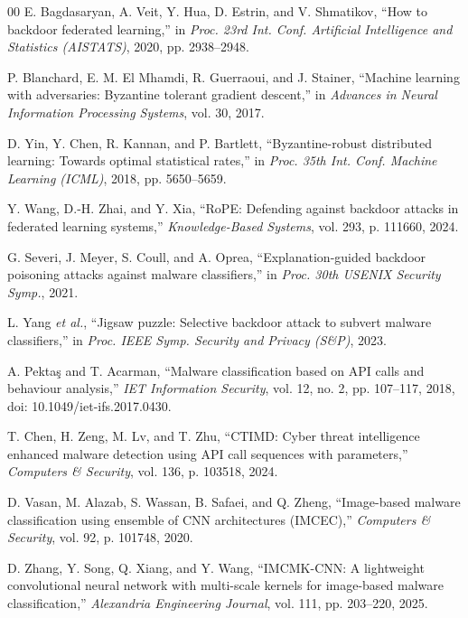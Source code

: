 \documentclass[conference]{IEEEtran}
\begin{document}
\begin{thebibliography}{00}
E. Bagdasaryan, A. Veit, Y. Hua, D. Estrin, and V. Shmatikov,
``How to backdoor federated learning,''
in \emph{Proc. 23rd Int. Conf. Artificial Intelligence and Statistics (AISTATS)},
2020, pp. 2938--2948.

P. Blanchard, E. M. El Mhamdi, R. Guerraoui, and J. Stainer, 
``Machine learning with adversaries: Byzantine tolerant gradient descent,'' 
in \emph{Advances in Neural Information Processing Systems}, vol. 30, 2017.

D. Yin, Y. Chen, R. Kannan, and P. Bartlett,
``Byzantine-robust distributed learning: Towards optimal statistical rates,''
in \emph{Proc. 35th Int. Conf. Machine Learning (ICML)},
2018, pp. 5650--5659.

Y. Wang, D.-H. Zhai, and Y. Xia,
``RoPE: Defending against backdoor attacks in federated learning systems,''
\emph{Knowledge-Based Systems}, vol. 293, p. 111660, 2024.

G. Severi, J. Meyer, S. Coull, and A. Oprea,
``Explanation-guided backdoor poisoning attacks against malware classifiers,''
in \emph{Proc. 30th USENIX Security Symp.}, 2021.

L. Yang \emph{et al.},
``Jigsaw puzzle: Selective backdoor attack to subvert malware classifiers,''
in \emph{Proc. IEEE Symp. Security and Privacy (S\&P)}, 2023.

A. Pektaş and T. Acarman, 
``Malware classification based on API calls and behaviour analysis,'' 
\emph{IET Information Security}, vol. 12, no. 2, pp. 107--117, 2018, 
doi: 10.1049/iet-ifs.2017.0430.

T. Chen, H. Zeng, M. Lv, and T. Zhu,
``CTIMD: Cyber threat intelligence enhanced malware detection using API call sequences with parameters,''
\emph{Computers \& Security}, vol. 136, p. 103518, 2024.

D. Vasan, M. Alazab, S. Wassan, B. Safaei, and Q. Zheng,
``Image-based malware classification using ensemble of CNN architectures (IMCEC),''
\emph{Computers \& Security}, vol. 92, p. 101748, 2020.

D. Zhang, Y. Song, Q. Xiang, and Y. Wang,
``IMCMK-CNN: A lightweight convolutional neural network with multi-scale kernels for image-based malware classification,''
\emph{Alexandria Engineering Journal}, vol. 111, pp. 203--220, 2025.


\end{thebibliography}
\end{document}
